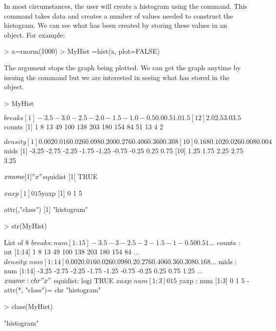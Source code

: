 In most circumstances, the user will create a histogram using the  command. This command takes data and creates a number of values needed to construct the histogram. We can see what has been created by storing these values in an object. For example:
\begin{Schunk}
\begin{Sinput}
> x=rnorm(1000)
> MyHist =hist(x, plot=FALSE)
\end{Sinput}
\end{Schunk}
The  argument stops the graph being plotted. We can get the graph anytime by issuing the  command but we are interested in seeing what \R{} has stored in the  object. 
\begin{Schunk}
\begin{Sinput}
> MyHist
\end{Sinput}
\begin{Soutput}
$breaks
 [1] -3.5 -3.0 -2.5 -2.0 -1.5 -1.0 -0.5  0.0  0.5  1.0  1.5
[12]  2.0  2.5  3.0  3.5

$counts
 [1]   1   8  13  49 100 138 203 180 154  84  51  13   4   2

$density
 [1] 0.002 0.016 0.026 0.098 0.200 0.276 0.406 0.360 0.308
[10] 0.168 0.102 0.026 0.008 0.004

$mids
 [1] -3.25 -2.75 -2.25 -1.75 -1.25 -0.75 -0.25  0.25  0.75
[10]  1.25  1.75  2.25  2.75  3.25

$xname
[1] "x"

$equidist
[1] TRUE

$xaxp
[1] 0 1 5

$yaxp
[1] 0 1 5

attr(,"class")
[1] "histogram"
\end{Soutput}
\begin{Sinput}
> str(MyHist)
\end{Sinput}
\begin{Soutput}
List of 8
 $ breaks  : num [1:15] -3.5 -3 -2.5 -2 -1.5 -1 -0.5 0 0.5 1 ...
 $ counts  : int [1:14] 1 8 13 49 100 138 203 180 154 84 ...
 $ density : num [1:14] 0.002 0.016 0.026 0.098 0.2 0.276 0.406 0.36 0.308 0.168 ...
 $ mids    : num [1:14] -3.25 -2.75 -2.25 -1.75 -1.25 -0.75 -0.25 0.25 0.75 1.25 ...
 $ xname   : chr "x"
 $ equidist: logi TRUE
 $ xaxp    : num [1:3] 0 1 5
 $ yaxp    : num [1:3] 0 1 5
 - attr(*, "class")= chr "histogram"
\end{Soutput}
\begin{Sinput}
> class(MyHist)
\end{Sinput}
\begin{Soutput}
[1] "histogram"
\end{Soutput}
\end{Schunk}

